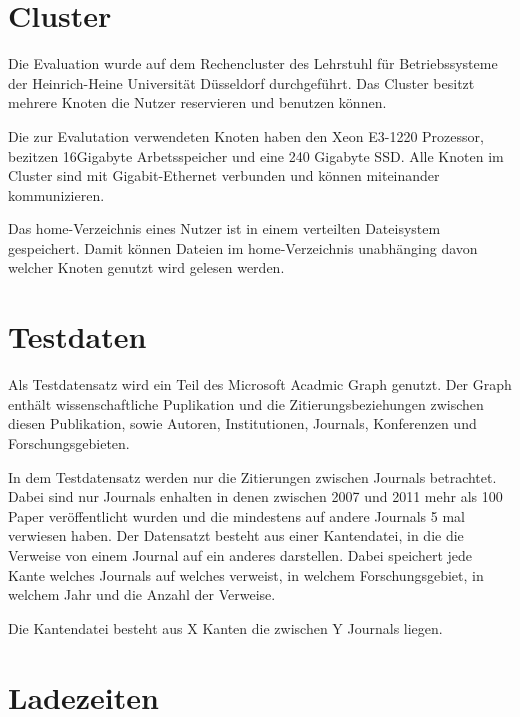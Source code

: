 
\section{Cluster}

Die Evaluation wurde auf dem Rechencluster des Lehrstuhl für Betriebssysteme der Heinrich-Heine Universität Düsseldorf durchgeführt.
Das Cluster besitzt mehrere Knoten die Nutzer reservieren und benutzen können.

Die zur Evalutation verwendeten Knoten haben den Xeon E3-1220 Prozessor, bezitzen 16Gigabyte Arbetsspeicher und eine 240 Gigabyte SSD.
Alle Knoten im Cluster sind mit Gigabit-Ethernet verbunden und können miteinander kommunizieren. 

Das home-Verzeichnis eines Nutzer ist in einem verteilten Dateisystem gespeichert. Damit können Dateien im home-Verzeichnis unabhänging davon welcher Knoten genutzt wird gelesen werden.

\section{Testdaten}


Als Testdatensatz wird ein Teil des Microsoft Acadmic Graph genutzt. Der Graph enthält wissenschaftliche Puplikation und die Zitierungsbeziehungen zwischen diesen Publikation, sowie Autoren, Institutionen, Journals, Konferenzen und Forschungsgebieten.

In dem Testdatensatz werden nur die Zitierungen zwischen Journals betrachtet. Dabei sind nur Journals enhalten in denen zwischen 2007 und 2011 mehr als 100 Paper veröffentlicht wurden und die mindestens auf andere Journals 5 mal verwiesen haben.
Der Datensatzt besteht aus einer Kantendatei, in die die Verweise von einem Journal auf ein anderes darstellen. Dabei speichert jede Kante welches Journals auf welches verweist, in welchem Forschungsgebiet, in welchem Jahr und die Anzahl der Verweise.

Die Kantendatei besteht aus X Kanten die zwischen Y Journals liegen.


\section{Ladezeiten}

